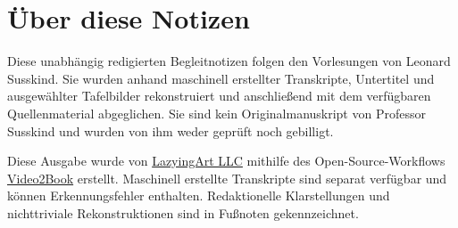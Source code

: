 \documentclass[11pt,oneside]{book}
\begin{document}
\frontmatter
\hypersetup{pageanchor=false}

\hypersetup{pageanchor=true}

\clearpage
\chapter{Über diese Notizen}
Diese unabhängig redigierten Begleitnotizen folgen den Vorlesungen von Leonard Susskind. Sie wurden anhand maschinell erstellter Transkripte, Untertitel und ausgewählter Tafelbilder rekonstruiert und anschließend mit dem verfügbaren Quellenmaterial abgeglichen. Sie sind kein Originalmanuskript von Professor Susskind und wurden von ihm weder geprüft noch gebilligt.

Diese Ausgabe wurde von \href{https://lazying.art}{LazyingArt LLC} mithilfe des Open-Source-Workflows \href{https://github.com/lachlanchen/Video2Book}{Video2Book} erstellt. Maschinell erstellte Transkripte sind separat verfügbar und können Erkennungsfehler enthalten. Redaktionelle Klarstellungen und nichttriviale Rekonstruktionen sind in Fußnoten gekennzeichnet.
\clearpage
\tableofcontents
\mainmatter








\end{document}
